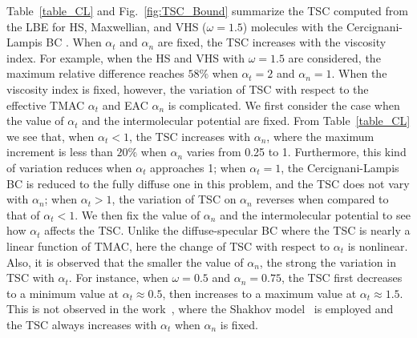 Table~\ref{table_CL} and Fig.~\ref{fig:TSC_Bound} summarize the TSC computed from the LBE for HS, Maxwellian, and VHS ($\omega=1.5$) molecules with the Cercignani-Lampis  BC . When $\alpha_t$ and $\alpha_n$ are fixed, the TSC increases with the viscosity index. For example, when the HS and VHS with $\omega=1.5$ are considered, the maximum relative difference reaches $58\%$ when $\alpha_t=2$ and $\alpha_n=1$. When the viscosity index is fixed, however, the variation of TSC with respect to the effective TMAC $\alpha_t$ and EAC $\alpha_n$ is complicated. We first consider the case when the value of $\alpha_t$ and the intermolecular potential are fixed. From Table~\ref{table_CL} we see that, when $\alpha_t<1$, the TSC increases with $\alpha_n$, where the maximum increment is less than $20\%$ when $\alpha_n$ varies from 0.25 to 1. Furthermore, this kind of variation reduces when $\alpha_t$ approaches 1; when $\alpha_t=1$, the Cercignani-Lampis  BC  is reduced to the fully diffuse one in this problem, and the TSC does not vary with $\alpha_n$; when $\alpha_t>1$, the variation of TSC on $\alpha_n$ reverses when compared to that of $\alpha_t<1$.
We then fix the value of $\alpha_n$ and the intermolecular potential to see how $\alpha_t$ affects the TSC.  Unlike the diffuse-specular BC where the TSC is nearly a linear function of TMAC, here the change of TSC with respect to $\alpha_t$ is nonlinear. Also, it is observed that the smaller the value of $\alpha_n$, the strong the variation in TSC with $\alpha_t$. 
For instance, when $\omega=0.5$ and $\alpha_n=0.75$, the TSC first decreases to a minimum value at $\alpha_t\approx 0.5$, then increases to a maximum value at $\alpha_t\approx 1.5$. This is not observed in the work~\cite{Sharipov2003CL}, where the Shakhov  model~\cite{Shakhov_S} is employed and the TSC always increases with $\alpha_t$ when $\alpha_n$ is fixed. 



